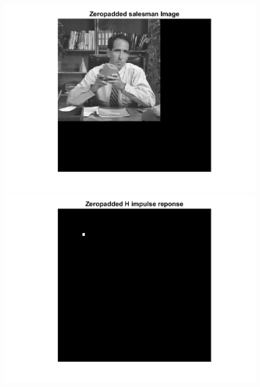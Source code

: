 \documentclass[11pt]{article} %
\begin{document}
\begin{figure}
\centering
	\includegraphics{1bc.png}
	\includegraphics{1bd.png}
\end{figure}
\end{document}
